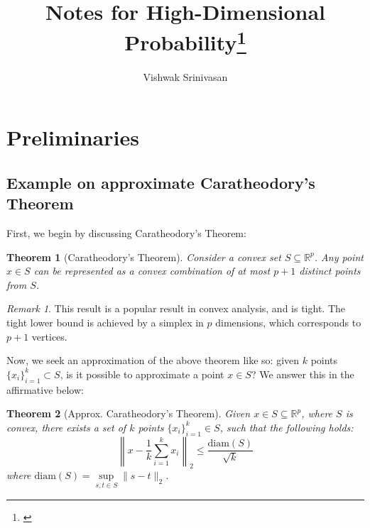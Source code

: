 \documentclass{article}
\title{Notes for High-Dimensional Probability\footnote{\citet{vershynin2019high}}}
\author{Vishwak Srinivasan}
\date{}
\newtheorem{theorem}{Theorem}[subsection]
\theoremstyle{remark}
\newtheorem*{remark}{Remark}
\newcommand{\real}{\mathbb{R}}
\begin{document}
\raggedright

\maketitle
\tableofcontents

\newpage

\section{Preliminaries}
\subsection{Example on approximate Caratheodory's Theorem}

First, we begin by discussing Caratheodory's Theorem:
\begin{theorem}[Caratheodory's Theorem]
\label{thm:approx-caratheodory}
Consider a convex set \(S \subseteq \real^{p}\). Any point \(x \in S\) can be represented as a convex combination of at most \(p + 1\) distinct points from \(S\).
\end{theorem}

\begin{remark}
This result is a popular result in convex analysis, and is tight. The tight lower bound is achieved by a simplex in \(p\) dimensions, which corresponds to \(p + 1\) vertices.
\end{remark}

Now, we seek an approximation of the above theorem like so: given \(k\) points \(\{x_{i}\}_{i=1}^{k} \subset S\), is it possible to approximate a point \(x \in S\)? We answer this in the affirmative below:
\begin{theorem}[Approx. Caratheodory's Theorem]
Given \(x \in S \subseteq \real^{p}\), where \(S\) is convex, there exists a set of \(k\) points \(\{x_{i}\}_{i=1}^{k} \in S\), such that the following holds:
\begin{equation*}
\left\|x - \frac{1}{k}\sum_{i=1}^{k}x_{i}\right\|_{2} \leq \frac{\mathrm{diam}(S)}{\sqrt{k}}
\end{equation*}
where \(\mathrm{diam}(S) = \sup\limits_{s, t \in S} \|s - t\|_{2}\).
\end{theorem}
\end{document}
